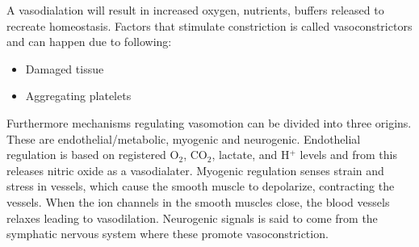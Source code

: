 A vasodialation will result in increased oxygen, nutrients, buffers released to recreate homeostasis.
Factors that stimulate constriction is called vasoconstrictors and can happen due to following:\cite{martini2012} 

\begin{itemize}
	\item Damaged tissue
	\item Aggregating platelets 
\end{itemize}

Furthermore mechanisms regulating vasomotion can be divided into three origins. These are endothelial/metabolic, myogenic and neurogenic. Endothelial regulation is based on registered O$_{2}$, CO$_{2}$, lactate, and H$^+$ levels and from this releases nitric oxide as a vasodialater. Myogenic regulation senses strain and stress in vessels, which cause the smooth muscle to depolarize, contracting the vessels. When the ion channels in the smooth muscles close, the blood vessels relaxes leading to vasodilation. Neurogenic signals is said to come from the symphatic nervous system where these promote vasoconstriction.\cite{segal2005,ince2005,nilsson2003}


